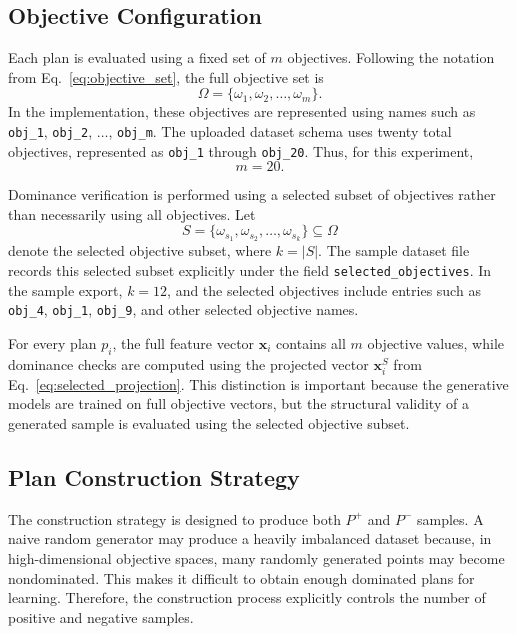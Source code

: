 \subsection{Objective Configuration}
\label{subsec:objective_configuration}

Each plan is evaluated using a fixed set of $m$ objectives. Following the notation from Eq.~\eqref{eq:objective_set}, the full objective set is
\begin{equation}
    \Omega = \{\omega_1, \omega_2, \ldots, \omega_m\}.
    \label{eq:dataset_full_objective_set}
\end{equation}
In the implementation, these objectives are represented using names such as \texttt{obj\_1}, \texttt{obj\_2}, $\ldots$, \texttt{obj\_m}. The uploaded dataset schema uses twenty total objectives, represented as \texttt{obj\_1} through \texttt{obj\_20}. Thus, for this experiment,
\begin{equation}
    m = 20.
    \label{eq:dataset_objective_count}
\end{equation}

Dominance verification is performed using a selected subset of objectives rather than necessarily using all objectives. Let
\begin{equation}
    S = \{\omega_{s_1}, \omega_{s_2}, \ldots, \omega_{s_k}\} \subseteq \Omega
    \label{eq:dataset_selected_objective_set}
\end{equation}
denote the selected objective subset, where $k = |S|$. The sample dataset file records this selected subset explicitly under the field \texttt{selected\_objectives}. In the sample export, $k=12$, and the selected objectives include entries such as \texttt{obj\_4}, \texttt{obj\_1}, \texttt{obj\_9}, and other selected objective names.

For every plan $p_i$, the full feature vector $\mathbf{x}_i$ contains all $m$ objective values, while dominance checks are computed using the projected vector $\mathbf{x}_i^{S}$ from Eq.~\eqref{eq:selected_projection}. This distinction is important because the generative models are trained on full objective vectors, but the structural validity of a generated sample is evaluated using the selected objective subset.

\subsection{Plan Construction Strategy}
\label{subsec:plan_construction_strategy}

The construction strategy is designed to produce both $P^{+}$ and $P^{-}$ samples. A naive random generator may produce a heavily imbalanced dataset because, in high-dimensional objective spaces, many randomly generated points may become nondominated. This makes it difficult to obtain enough dominated plans for learning. Therefore, the construction process explicitly controls the number of positive and negative samples.

